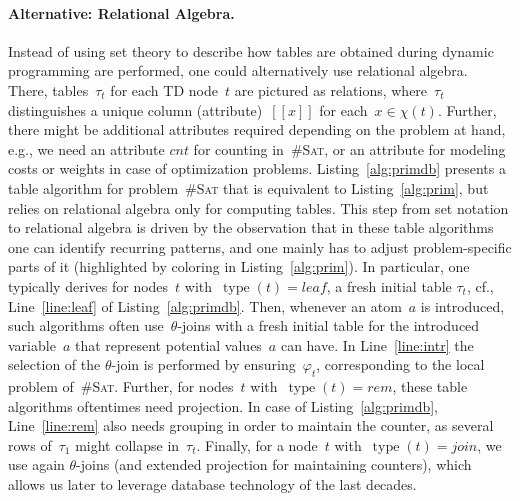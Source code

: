 \documentclass{llncs}
\newcommand{\cid}[1]{\ensuremath{[\![#1]\!]}}
\newcommand{\cSAT}{\textsc{\#Sat}\xspace}%
\newcommand{\tab}[1]{\ensuremath{\tau_{#1}}}
\DeclareMathOperator{\type}{type}
\newcommand{\leaf}{\textit{leaf}}
\newcommand{\rem}{\textit{rem}}
\newcommand{\join}{\textit{join}}
\begin{document}
\paragraph*{Alternative: Relational Algebra.}
\noindent Instead of using set theory to describe how tables are obtained during dynamic programming 
are performed, one could alternatively use relational algebra. %
There, tables~$\tab{t}$ for each TD node~$t$ are pictured as relations, where~$\tab{t}$ distinguishes a unique column (attribute)~$\cid{x}$ for each~$x\in\chi(t)$.
Further, there might be additional attributes required depending on the problem at hand, e.g., we need an attribute $cnt$ for counting in~\cSAT, or an attribute for modeling costs or weights in case of optimization problems.
Listing~\ref{alg:primdb} presents a table algorithm for problem~\cSAT that is equivalent to Listing~\ref{alg:prim}, but relies on relational algebra only for computing tables.
This step from set notation to relational algebra is driven by the observation that in these table algorithms one can identify recurring patterns, and one mainly has to adjust problem-specific parts of it (highlighted by coloring in Listing~\ref{alg:prim}).
%
%
In particular, one typically derives for nodes~$t$ with~$\type(t)=\leaf$, a fresh initial table $\tab{t}$, cf., Line~\ref{line:leaf} of Listing~\ref{alg:primdb}.
Then, whenever an atom~$a$ is introduced, such algorithms often use~$\theta$-joins with a fresh initial table for the introduced variable~$a$ that represent potential values~$a$ can have. In Line~\ref{line:intr} the selection of the $\theta$-join is performed by ensuring~$\varphi_t$, corresponding to the local problem of~\cSAT.
Further, for nodes~$t$ with~$\type(t)=\rem$, these table algorithms oftentimes need projection. 
In case of Listing~\ref{alg:primdb}, Line~\ref{line:rem} also needs grouping in order to maintain the counter, as several rows of~$\tab{1}$ might collapse in~$\tab{t}$.
Finally, for a node~$t$ with~$\type(t)=\join$, we use again $\theta$-joins (and extended projection for maintaining counters), which allows us later to leverage database technology of the last decades.
\end{document}

